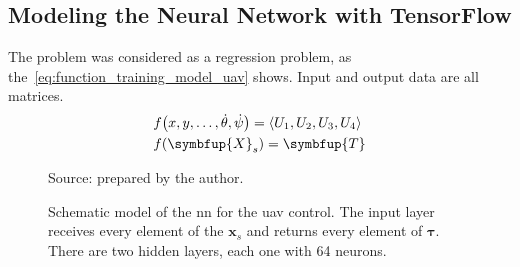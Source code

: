 \subsection{Modeling the Neural Network with TensorFlow}

The problem was considered as a regression problem, as the~\cref{eq:function_training_model_uav} shows. Input and output data are all matrices.
%
\begin{subequations}\label{eq:function_training_model_uav}
    \begin{align}
        &f\big(x,y,\ldots,\dot{\theta},\dot{\psi}\big) = \langle U_1, U_2, U_3, U_4 \rangle \\
        &f(\symbfup{X}_s) = \symbfup{T}
    \end{align}
\end{subequations}

\begin{figure}[!htb]
    \centering
    \caption[Schematic model of the NN for the UAV control.]{Schematic model of the \gls*{nn} for the \gls*{uav} control. The input layer receives every element of the \(\symbf{x}_s\) and returns every element of \(\symbf{\tau}\). There are two hidden layers, each one with 64 neurons.}
    

    {\footnotesize Source: prepared by the author.}
\end{figure}